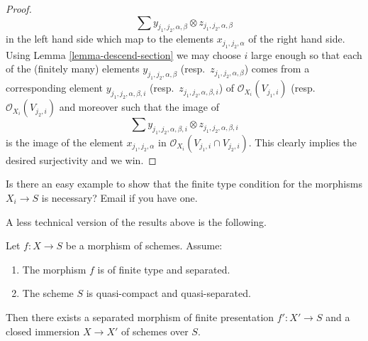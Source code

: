 \begin{proof}
$$
\sum y_{j_1, j_2, \alpha, \beta} \otimes z_{j_1, j_2, \alpha, \beta}
$$
in the left hand side which map to the elements
$x_{j_1, j_2, \alpha}$ of the right hand side.
Using Lemma \ref{lemma-descend-section} we may choose
$i$ large enough so that each of the (finitely many)
elements $y_{j_1, j_2, \alpha, \beta}$ (resp.\ 
$z_{j_1, j_2, \alpha, \beta}$) comes from a corresponding element
$y_{j_1, j_2, \alpha, \beta, i}$ (resp.\ 
$z_{j_1, j_2, \alpha, \beta, i}$) of
$\mathcal{O}_{X_i}(V_{j_1, i})$ (resp.\ 
$\mathcal{O}_{X_i}(V_{j_2, i})$ and moreover such that the image
of
$$
\sum y_{j_1, j_2, \alpha, \beta, i} \otimes z_{j_1, j_2, \alpha, \beta, i}
$$
is the image of the element $x_{j_1, j_2, \alpha}$
in $\mathcal{O}_{X_i}(V_{j_1, i} \cap V_{j_2, i})$.
This clearly implies the desired surjectivity and we win.
\end{proof}

\begin{remark}
\label{remark-question-finite-type-necessary}
Is there an easy example to show that the finite type condition
for the morphisms $X_i \to S$ is necessary? Email if you have
one.
\end{remark}

\noindent
A less technical version of the results above is the following.

\begin{proposition}
\label{proposition-separated-closed-in-finite-presentation}
Let $f : X \to S$ be a morphism of schemes.
Assume:
\begin{enumerate}
\item The morphism $f$ is of finite type and separated.
\item The scheme $S$ is quasi-compact and quasi-separated.
\end{enumerate}
Then there exists a separated morphism of finite presentation
$f' : X' \to S$ and a closed immersion $X \to X'$ of schemes over $S$.
\end{proposition}

